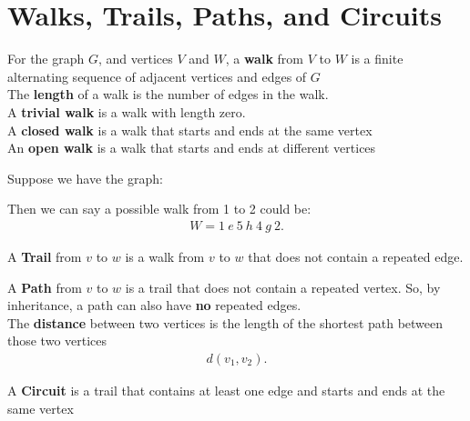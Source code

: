 \documentclass{report}
\begin{document}
    \section{\LARGE Walks, Trails, Paths, and Circuits}
    \bigbreak \noindent 
    \begin{definition}
    For the graph $G$, and vertices $V$ and $W$, a \textbf{walk} from $V$ to $W$ is a finite alternating sequence of adjacent vertices and edges of $G$ \\
    The \textbf{length} of a walk is the number of edges in the walk. \\
    A \textbf{trivial walk} is a walk with length zero. \\
    A \textbf{closed walk} is a walk that starts and ends at the same vertex \\
    An \textbf{open walk} is a walk that starts and ends at different vertices 
    \end{definition}
    \bigbreak \noindent 
    Suppose we have the graph:
    \bigbreak \noindent 
    \begin{minipage}[]{0.47\textwidth}
    \end{minipage}
    \begin{minipage}[]{0.47\textwidth}
        Then we can say a possible walk from 1 to 2 could be:
        \begin{align*}
           W = 1\ e\ 5\ h\ 4\ g\ 2 
        .\end{align*}
    \end{minipage}
    \bigbreak \noindent 
    \begin{definition}
        A \textbf{Trail} from $v$ to $w$ is a walk from $v$ to $w$ that does not contain a repeated edge.
    \end{definition}
    \bigbreak \noindent 
    \smallbreak \noindent
    \begin{definition}
        A \textbf{Path}  from $v$ to $w$ is a trail that does not contain a repeated vertex. So, by inheritance, a path can also have \textbf{no} repeated edges. \\
       The \textbf{distance} between two vertices is the length of the shortest path between those two vertices
       \begin{align*}
           d(v_{1},v_{2})
       .\end{align*}
    \end{definition}
    \bigbreak \noindent 
    \begin{definition}
        A \textbf{Circuit}  is a trail that contains at least one edge and starts and ends at the same vertex
    \end{definition}
\end{document}
